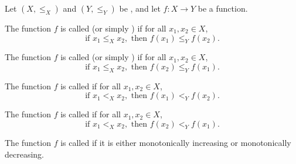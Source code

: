 \begin{definition} \label{definition:monotone_function_on_an_ordered_set}
    Let $(X, \leq_X)$ and $(Y, \leq_Y)$ be , and let $f : X \to Y$ be a function.

    The function $f$ is called  (or simply ) if for all $x_1, x_2 \in X$,
    $$\text{if } x_1 \leq_X x_2, \text{ then } f(x_1) \leq_Y f(x_2).$$

    The function $f$ is called  (or simply ) if for all $x_1, x_2 \in X$,
    $$\text{if } x_1 \leq_X x_2, \text{ then } f(x_2) \leq_Y f(x_1).$$

    The function $f$ is called  if for all $x_1, x_2 \in X$,
    $$\text{if } x_1 <_X x_2, \text{ then } f(x_1) <_Y f(x_2).$$

    The function $f$ is called  if for all $x_1, x_2 \in X$,
    $$\text{if } x_1 <_X x_2, \text{ then } f(x_2) <_Y f(x_1).$$

    The function $f$ is called  if it is either monotonically increasing or monotonically decreasing.
\end{definition}
